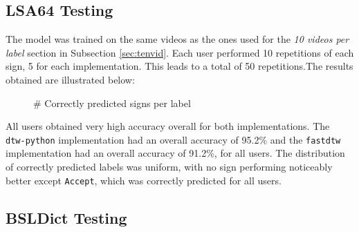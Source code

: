 \documentclass[final,rdr32.tex]{subfiles}
\begin{document}
\subsection{LSA64 Testing}

The model was trained on the same videos as the ones used for the \textit{10 videos per label} section in Subsection \ref{sec:tenvid}. Each user performed 10 repetitions of each sign, 5 for each implementation. This leads to a total of 50 repetitions.The results obtained are illustrated below:

\begin{figure}[H]
    \begin{center}
    \end{center}
    \caption{\# Correctly predicted signs per label}
    \label{bar:lsa64user}
\end{figure}

All users obtained very high accuracy overall for both implementations. The \\ \verb|dtw-python| implementation had an overall accuracy of 95.2\% and the \verb|fastdtw| implementation had an overall accuracy of 91.2\%, for all users. The distribution of correctly predicted labels was uniform, with no sign performing noticeably better except \verb|Accept|, which was correctly predicted for all users.

\subsection{BSLDict Testing}
\end{document}
